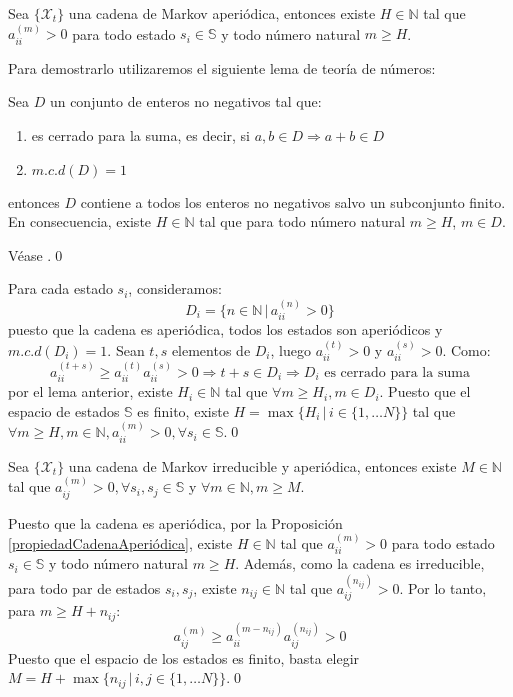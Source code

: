 \begin{proposition}\label{propiedadCadenaAperiódica}
    Sea $\{\mathcal{X}_t\}$ una cadena de Markov aperiódica, entonces existe $H\in\mathbb{N}$ tal que $a_{ii}^{(m)}>0$ para todo estado $s_i\in\mathbb{S}$ y todo número natural $m\geq H$.
\end{proposition}
Para demostrarlo utilizaremos el siguiente lema de teoría de números:
\begin{lemma}
Sea $D$ un conjunto de enteros no negativos tal que:
\begin{enumerate}
    \item es cerrado para la suma, es decir, si $a,b\in D\Longrightarrow a+b\in D$
    \item $m.c.d(D)=1$
\end{enumerate}
entonces $D$ contiene a todos los enteros no negativos salvo un subconjunto finito. En consecuencia, existe $H\in\mathbb{N}$ tal que para todo número natural $m\geq H$, $m\in D$.
\end{lemma}
\begin{proofs*}
    Véase \cite[Páginas 25 y 26]{Klappenecker}.\qed  
\end{proofs*}
\begin{proofs*}
Para cada estado $s_i$, consideramos:
\[D_i=\{n\in\mathbb{N}\,|\, a_{ii}^{(n)}>0\}\]
puesto que la cadena es aperiódica, todos los estados son aperiódicos y $m.c.d(D_i)=1$. Sean $t,s$ elementos de $D_i$, luego $a_{ii}^{(t)}>0$ y $a_{ii}^{(s)}>0$. Como:
\[a_{ii}^{(t+s)}\geq a_{ii}^{(t)}a_{ii}^{(s)}>0\Longrightarrow t+s\in D_i \Longrightarrow D_i \text{ es cerrado para la suma}\]
por el lema anterior, existe $H_i\in\mathbb{N}$ tal que $\forall m\geq H_i, m\in D_i$. Puesto que el espacio de estados $\mathbb{S}$ es finito, existe $H=\max\{H_i\,|\, i \in\{1,\dots N\}\}$ tal que $\forall m\geq H, m\in\mathbb{N}, a_{ii}^{(m)}>0, \forall s_i\in\mathbb{S}$.\qed
\end{proofs*}

\begin{proposition}\label{propiedadCadenaIrreducibleAperiódica}
    Sea $\{\mathcal{X}_t\}$ una cadena de Markov irreducible y aperiódica, entonces existe $M\in\mathbb{N}$ tal que $a_{ij}^{(m)}>0, \forall s_i, s_j\in\mathbb{S}$ y $\forall m\in\mathbb{N}, m\geq M$.
\end{proposition}
\begin{proofs*}
Puesto que la cadena es aperiódica, por la Proposición \ref{propiedadCadenaAperiódica}, existe $H\in\mathbb{N}$ tal que $a_{ii}^{(m)}>0$ para todo estado $s_i\in\mathbb{S}$ y todo número natural $m\geq H$.
Además, como la cadena es irreducible, para todo par de estados $s_i, s_j$, existe $n_{ij}\in\mathbb{N}$ tal que $a_{ij}^{(n_{ij})}>0$. Por lo tanto, para $m\geq H+n_{ij}$:
\[a_{ij}^{(m)}\geq a_{ii}^{(m-n_{ij})}a_{ij}^{(n_{ij})}>0\]
Puesto que el espacio de los estados es finito, basta elegir $M=H+\max\{n_{ij}\,|\, i,j \in\{1,\dots N\}\}$.\qed
\end{proofs*}

